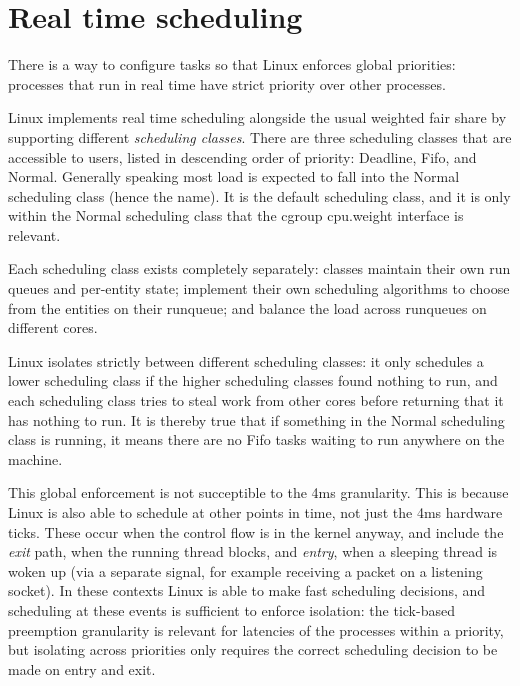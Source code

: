 
\chapter{Real time scheduling}

There is a way to configure tasks so that Linux enforces global priorities:
processes that run in real time have strict priority over other processes.

Linux implements real time scheduling alongside the usual weighted fair share by
supporting different \textit{scheduling classes}. There are three scheduling
classes that are accessible to users, listed in descending order of priority:
Deadline, Fifo, and Normal. Generally speaking most load is expected to fall
into the Normal scheduling class (hence the name). It is the default scheduling
class, and it is only within the Normal scheduling class that the cgroup
cpu.weight interface is relevant.

Each scheduling class exists completely separately: classes maintain their own
run queues and per-entity state; implement their own scheduling algorithms to
choose from the entities on their runqueue; and balance the load across
runqueues on different cores.

Linux isolates strictly between different scheduling classes: it only schedules
a lower scheduling class if the higher scheduling classes found nothing to run,
and each scheduling class tries to steal work from other cores before returning
that it has nothing to run. It is thereby true that if something in the Normal
scheduling class is running, it means there are no Fifo tasks waiting to run
anywhere on the machine.

This global enforcement is not succeptible to the 4ms granularity. This is
because Linux is also able to schedule at other points in time, not just the 4ms
hardware ticks. These occur when the control flow is in the kernel anyway, and
include the \textit{exit} path, when the running thread blocks, and
\textit{entry}, when a sleeping thread is woken up (via a separate signal, for
example receiving a packet on a listening socket). In these contexts Linux is
able to make fast scheduling decisions, and scheduling at these events is
sufficient to enforce isolation: the tick-based preemption granularity is
relevant for latencies of the processes within a priority, but isolating across
priorities only requires the correct scheduling decision to be made on entry and
exit. 

